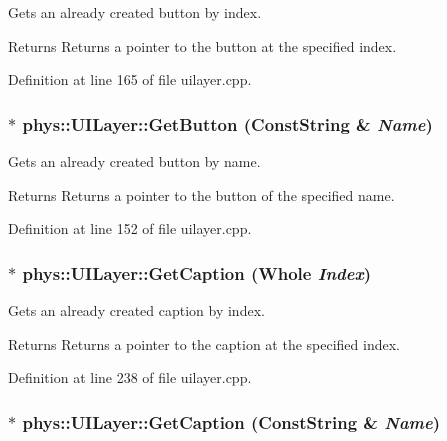 Gets an already created button by index. 

\begin{DoxyReturn}{Returns}
Returns a pointer to the button at the specified index. 
\end{DoxyReturn}


Definition at line 165 of file uilayer.cpp.

\hypertarget{classphys_1_1UILayer_ace0f4fa9270b252dd593212182d43ebf}{
\subsubsection[{GetButton}]{ $\ast$ phys::UILayer::GetButton ({\bf ConstString} \& {\em Name})}}
\label{da/d48/classphys_1_1UILayer_ace0f4fa9270b252dd593212182d43ebf}


Gets an already created button by name. 

\begin{DoxyReturn}{Returns}
Returns a pointer to the button of the specified name. 
\end{DoxyReturn}


Definition at line 152 of file uilayer.cpp.

\hypertarget{classphys_1_1UILayer_a0f087439496766594aa3f94a8ef2ec2b}{
\subsubsection[{GetCaption}]{ $\ast$ phys::UILayer::GetCaption ({\bf Whole} {\em Index})}}
\label{da/d48/classphys_1_1UILayer_a0f087439496766594aa3f94a8ef2ec2b}


Gets an already created caption by index. 

\begin{DoxyReturn}{Returns}
Returns a pointer to the caption at the specified index. 
\end{DoxyReturn}


Definition at line 238 of file uilayer.cpp.

\hypertarget{classphys_1_1UILayer_a2f9a2b50de833f5c57d4410fd1ea6eba}{
\subsubsection[{GetCaption}]{ $\ast$ phys::UILayer::GetCaption ({\bf ConstString} \& {\em Name})}}
\label{da/d48/classphys_1_1UILayer_a2f9a2b50de833f5c57d4410fd1ea6eba}


